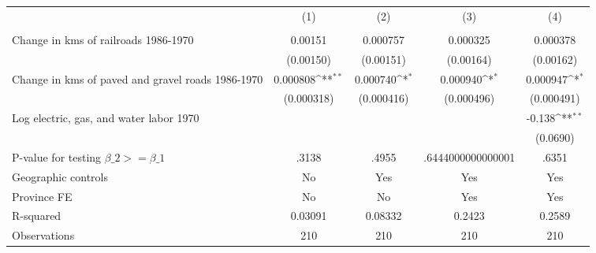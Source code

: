 {
\def\sym#1{\ifmmode^{#1}\else\(^{#1}\)\fi}
\begin{tabular}{l*{4}{c}}
\hline\hline
                &\multicolumn{1}{c}{(1)}&\multicolumn{1}{c}{(2)}&\multicolumn{1}{c}{(3)}&\multicolumn{1}{c}{(4)}\\
                &\multicolumn{1}{c}{}&\multicolumn{1}{c}{}&\multicolumn{1}{c}{}&\multicolumn{1}{c}{}\\
\hline
Change in kms of railroads 1986-1970&  0.00151         & 0.000757         & 0.000325         & 0.000378         \\
                &(0.00150)         &(0.00151)         &(0.00164)         &(0.00162)         \\
[1em]
Change in kms of paved and gravel roads 1986-1970& 0.000808\sym{**} & 0.000740\sym{*}  & 0.000940\sym{*}  & 0.000947\sym{*}  \\
                &(0.000318)         &(0.000416)         &(0.000496)         &(0.000491)         \\
[1em]
Log electric, gas, and water labor 1970&                  &                  &                  &   -0.138\sym{**} \\
                &                  &                  &                  & (0.0690)         \\
\hline
P-value for testing $\beta\_{2} >= \beta\_{1}$&    .3138         &    .4955         &.6444000000000001         &    .6351         \\
Geographic controls&       No         &      Yes         &      Yes         &      Yes         \\
Province FE     &       No         &       No         &      Yes         &      Yes         \\
R-squared       &  0.03091         &  0.08332         &   0.2423         &   0.2589         \\
Observations    &      210         &      210         &      210         &      210         \\
\hline\hline
\end{tabular}
}
